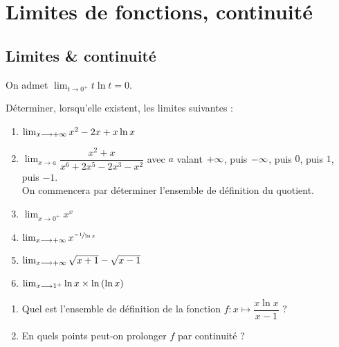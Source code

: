 \chapter{Limites de fonctions, continuité}

\minitoc

\section{Limites \& continuité}

\begin{exo}[Exercice 1]
On admet \(\lim_{t\to0^+}t\ln t=0\).

Déterminer, lorsqu'elle existent, les limites suivantes :

\begin{enumerate}
\item \(\lim_{x\longrightarrow+\infty}x^2-2x+x\ln x\) \\

\item \(\lim_{x\to a}\dfrac{x^2+x}{x^6+2x^5-2x^3-x^2}\) avec \(a\) valant \(+\infty\), puis \(-\infty\), puis \(0\), puis \(1\), puis \(-1\). \\

On commencera par déterminer l'ensemble de définition du quotient. \\

\item \(\lim_{x\to0^+}x^x\) \\

\item \(\lim_{x\longrightarrow+\infty}x^{\nicefrac{-1}{\ln x}}\) \\

\item \(\lim_{x\longrightarrow+\infty}\sqrt{x+1}-\sqrt{x-1}\) \\

\item \(\lim_{x\longrightarrow1^+}\ln x\times\ln\left(\ln x\right)\)
\end{enumerate}
\end{exo}

\begin{corr}
\end{corr}

\begin{exo}[Exercice 2]
\begin{enumerate}
\item Quel est l'ensemble de définition de la fonction \(f:x\mapsto\dfrac{x\ln x}{x-1}\) ? \\

\item En quels points peut-on prolonger \(f\) par continuité ?
\end{enumerate}
\end{exo}

